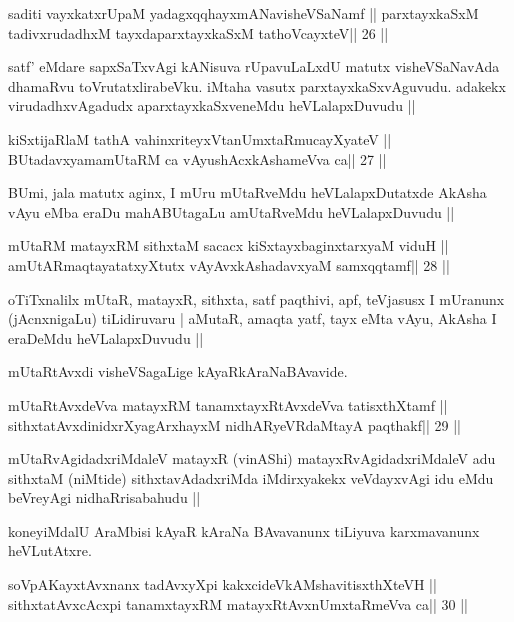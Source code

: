 \begin{shl}
saditi vayxkatxrUpaM yadagxqqhayxmANavisheVSaNamf ||
parxtayxkaSxM tadivxrudadhxM tayxdaparxtayxkaSxM tathoVcayxteV\hfill || 26 ||
\end{shl}

\begin{artha}
satf' eMdare sapxSaTxvAgi kANisuva rUpavuLaLxdU matutx visheVSaNavAda
dhamaRvu toVrutatxlirabeVku. iMtaha vasutx
parxtayxkaSxvAguvudu. adakekx virudadhxvAgadudx aparxtayxkaSxveneMdu
heVLalapxDuvudu ||
\end{artha}

\begin{shl}
kiSxtijaRlaM tathA vahinxriteyxVtanUmxtaRmucayXyateV ||
BUtadavxyamamUtaRM ca vAyushAcx\s\s kAshameVva ca\hfill || 27 ||
\end{shl}

\begin{artha}
BUmi, jala matutx aginx, I mUru mUtaRveMdu heVLalapxDutatxde AkAsha
vAyu eMba eraDu mahABUtagaLu amUtaRveMdu heVLalapxDuvudu ||
\end{artha}

\begin{shl}
mUtaRM matayxRM sithxtaM sacacx kiSxtayxbaginxtarxyaM viduH ||
amUtARmaqtayatatxyXtutx vAyAvxkAshadavxyaM samxqqtamf\hfill || 28 ||
\end{shl}

\begin{artha}
oTiTxnalilx mUtaR, matayxR, sithxta, satf paqthivi, apf, teVjasusx I
mUranunx (jAcnxnigaLu) tiLidiruvaru | aMutaR, amaqta yatf, tayx eMta
vAyu, AkAsha I eraDeMdu heVLalapxDuvudu ||

mUtaRtAvxdi visheVSagaLige kAyaRkAraNaBAvavide.
\end{artha}

\begin{shl}
mUtaRtAvxdeVva matayxRM tanamxtayxRtAvxdeVva tatisxthXtamf ||
sithxtatAvxdinidxrXyagArxhayxM nidhARyeVRdaMtayA paqthakf\hfill || 29 ||
\end{shl}

\begin{artha}
mUtaRvAgidadxriMdaleV matayxR (vinAShi) matayxRvAgidadxriMdaleV adu
sithxtaM (niMtide) sithxtavAdadxriMda iMdirxyakekx veVdayxvAgi idu
eMdu beVreyAgi nidhaRrisabahudu ||

koneyiMdalU AraMbisi kAyaR kAraNa BAvavanunx tiLiyuva karxmavanunx heVLutAtxre.
\end{artha}

\begin{shl}
soVpAKayxtAvxnanx tadAvxyXpi kakxcideVkAMshavitisxthXteVH ||
sithxtatAvxcAcxpi tanamxtayxRM matayxRtAvxnUmxtaRmeVva ca\hfill || 30 ||
\end{shl}

